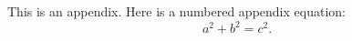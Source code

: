 
%

This is an appendix.  Here is a numbered appendix equation:
\begin{equation}
    a^2 + b^2 = c^2.
\end{equation}
